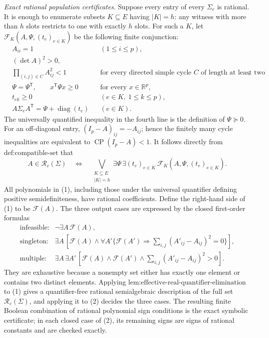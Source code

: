 \emph{Exact rational population certificates.}  Suppose every entry of every \(\Sigma_e\) is rational.  It is enough to enumerate subsets \(K\subseteq E\) having \(|K|=h\): any witness with more than \(h\) slots restricts to one with exactly \(h\) slots.  For such a \(K\), let \(\mathcal F_K(A,\Psi,(t_e)_{e\in K})\) be the following finite conjunction:
\[
\begin{aligned}
&A_{ii}=1 &&(1\le i\le p),\\
&(\det A)^2>0,\\
&\prod_{(i,j)\in C}A_{ij}^2<1
&&\text{for every directed simple cycle \(C\) of length at least two},\\
&\Psi=\Psi^{\mathsf T},\qquad x^{\mathsf T}\Psi x\ge0
&&\text{for every \(x\in\mathbb R^p\)},\\
&t_{ek}\ge0 &&(e\in K,\ 1\le k\le p),\\
&A\Sigma_eA^{\mathsf T}=\Psi+\operatorname{diag}(t_e) &&(e\in K).
\end{aligned}
\]
The universally quantified inequality in the fourth line is the definition of \(\Psi\succeq0\).  For an off-diagonal entry, \((I_p-A)_{ij}=-A_{ij}\); hence the finitely many cycle inequalities are equivalent to \(\operatorname{CP}(I_p-A)<1\).  It follows directly from \(\text{def:compatible-set}\) that
\[
A\in\mathcal R_c(\Sigma)
\quad\Longleftrightarrow\quad
\bigvee_{\substack{K\subseteq E\\|K|=h}}
\exists\Psi\,\exists(t_e)_{e\in K}\ \mathcal F_K(A,\Psi,(t_e)_{e\in K}).
\tag{1}
\]
All polynomials in (1), including those under the universal quantifier defining positive semidefiniteness, have rational coefficients.  Define the right-hand side of (1) to be \(\mathcal F(A)\).  The three output cases are expressed by the closed first-order formulas
\[
\begin{array}{ll}
\text{infeasible:}&\neg\exists A\,\mathcal F(A),\\[2mm]
\text{singleton:}&\exists A\,[\mathcal F(A)\wedge
 \forall A'\{\mathcal F(A')\Rightarrow\sum_{i,j}(A'_{ij}-A_{ij})^2=0\}],\\[2mm]
\text{multiple:}&\exists A\,\exists A'\,[\mathcal F(A)\wedge\mathcal F(A')
 \wedge\sum_{i,j}(A'_{ij}-A_{ij})^2>0].
\end{array}
\tag{2}
\]
They are exhaustive because a nonempty set either has exactly one element or contains two distinct elements.  Applying \(\text{lem:effective-real-quantifier-elimination}\) to (1) gives a quantifier-free rational semialgebraic description of the full set \(\mathcal R_c(\Sigma)\), and applying it to (2) decides the three cases.  The resulting finite Boolean combination of rational polynomial sign conditions is the exact symbolic certificate; in each closed case of (2), its remaining signs are signs of rational constants and are checked exactly.

